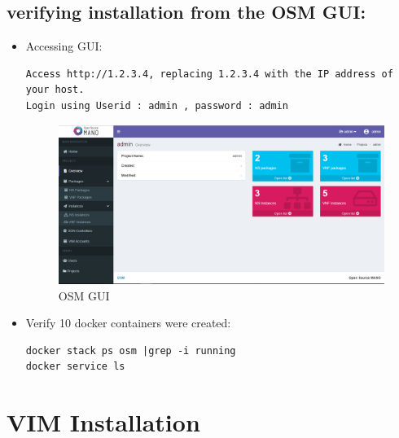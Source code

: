 \subsection{verifying installation from the OSM GUI:}
\begin{itemize}
\item Accessing GUI:
\begin{lstlisting} 
Access http://1.2.3.4, replacing 1.2.3.4 with the IP address of your host.
Login using Userid : admin , password : admin
\end{lstlisting}

\begin{figure} [H]
\centering
\includegraphics[scale=0.5\linewidth]{figures/sh1}
\caption{OSM GUI}
\end{figure}

\item Verify 10 docker containers were created:
\begin{lstlisting} 
docker stack ps osm |grep -i running
docker service ls
\end{lstlisting}
\end{itemize}
\section{VIM Installation}
